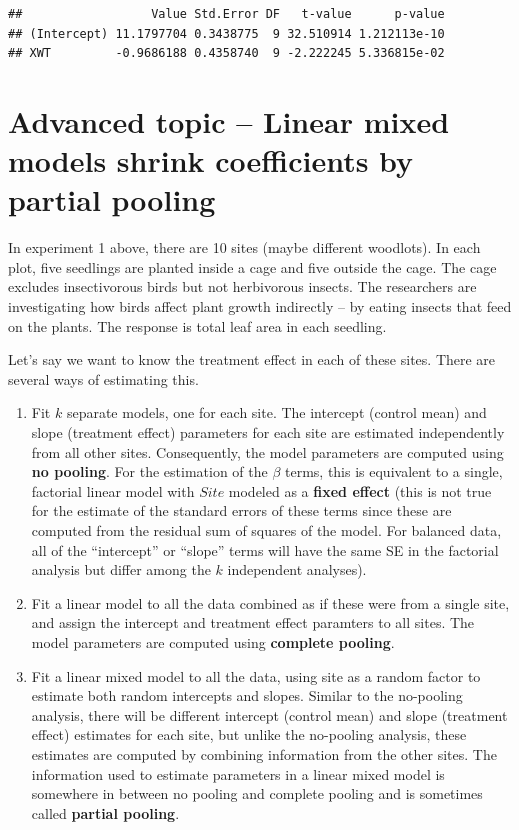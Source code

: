 \documentclass[]{book}
\begin{document}
\begin{verbatim}
##                  Value Std.Error DF   t-value      p-value
## (Intercept) 11.1797704 0.3438775  9 32.510914 1.212113e-10
## XWT         -0.9686188 0.4358740  9 -2.222245 5.336815e-02
\end{verbatim}

\hypertarget{advanced-topic-linear-mixed-models-shrink-coefficients-by-partial-pooling}{%
\section{Advanced topic -- Linear mixed models shrink coefficients by partial pooling}\label{advanced-topic-linear-mixed-models-shrink-coefficients-by-partial-pooling}}

In experiment 1 above, there are 10 sites (maybe different woodlots). In each plot, five seedlings are planted inside a cage and five outside the cage. The cage excludes insectivorous birds but not herbivorous insects. The researchers are investigating how birds affect plant growth indirectly -- by eating insects that feed on the plants. The response is total leaf area in each seedling.

Let's say we want to know the treatment effect in each of these sites. There are several ways of estimating this.

\begin{enumerate}
\def\labelenumi{\arabic{enumi}.}
\item
  Fit \(k\) separate models, one for each site. The intercept (control mean) and slope (treatment effect) parameters for each site are estimated independently from all other sites. Consequently, the model parameters are computed using \textbf{no pooling}. For the estimation of the \(\beta\) terms, this is equivalent to a single, factorial linear model with \(Site\) modeled as a \textbf{fixed effect} (this is not true for the estimate of the standard errors of these terms since these are computed from the residual sum of squares of the model. For balanced data, all of the ``intercept'' or ``slope'' terms will have the same SE in the factorial analysis but differ among the \(k\) independent analyses).
\item
  Fit a linear model to all the data combined as if these were from a single site, and assign the intercept and treatment effect paramters to all sites. The model parameters are computed using \textbf{complete pooling}.
\item
  Fit a linear mixed model to all the data, using site as a random factor to estimate both random intercepts and slopes. Similar to the no-pooling analysis, there will be different intercept (control mean) and slope (treatment effect) estimates for each site, but unlike the no-pooling analysis, these estimates are computed by combining information from the other sites. The information used to estimate parameters in a linear mixed model is somewhere in between no pooling and complete pooling and is sometimes called \textbf{partial pooling}.
\end{enumerate}
\end{document}
